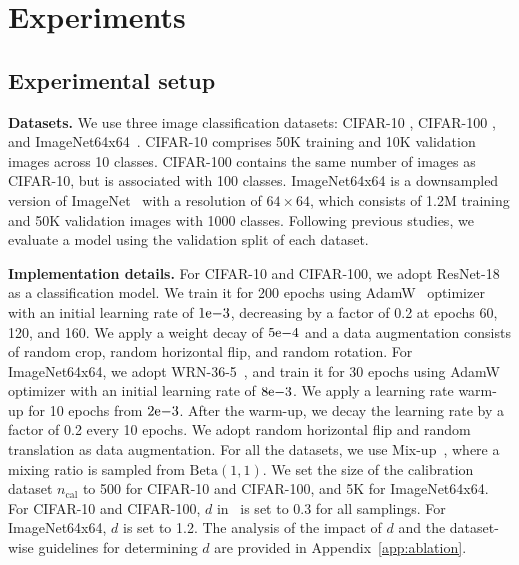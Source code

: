 \section{Experiments}
\label{sec:exp}

\subsection{Experimental setup}
\label{sec:setup}

\textbf{Datasets.}
We use three image classification datasets: CIFAR-10 \citep{krizhevsky2009learning}, CIFAR-100 \citep{krizhevsky2009learning}, and ImageNet64x64~\citep{chrabaszcz2017downsampled}.
CIFAR-10 comprises 50K training and 10K validation images across 10 classes.
CIFAR-100 contains the same number of images as CIFAR-10, but is associated with 100 classes.
ImageNet64x64 is a downsampled version of ImageNet~\citep{5206848} with a resolution of $64 \times 64$, which consists of 1.2M training and 50K validation images with 1000 classes.
Following previous studies, we evaluate a model using the validation split of each dataset.






\noindent\textbf{Implementation details.}
For CIFAR-10 and CIFAR-100, we adopt ResNet-18~\citep{he2016deep} as a classification model.
We train it for 200 epochs using AdamW~\citep{loshchilov2017decoupled} optimizer with an initial learning rate of ${1}\mathrm{e}{-3}$, decreasing by a factor of 0.2 at epochs 60, 120, and 160.
We apply a weight decay of ${5}\mathrm{e}{-4}$ and a data augmentation consists of random crop, random horizontal flip, and random rotation.
For ImageNet64x64, we adopt WRN-36-5~\citep{zagoruyko2016wide}, and train it for 30 epochs using AdamW optimizer with an initial learning rate of ${8}\mathrm{e}{-3}$.
We apply a learning rate warm-up for 10 epochs from ${2}\mathrm{e}{-3}$.
After the warm-up, we decay the learning rate by a factor of 0.2 every 10 epochs.
We adopt random horizontal flip and random translation as data augmentation.
For all the datasets, we use Mix-up~\citep{zhang2018mixup}, where a mixing ratio is sampled from $\text{Beta}(1,1)$.
We set the size of the calibration dataset $n_\text{cal}$ to 500 for CIFAR-10 and CIFAR-100, and 5K for ImageNet64x64.
For CIFAR-10 and CIFAR-100, $d$ in~ is set to 0.3 for all samplings. For ImageNet64x64, $d$ is set to 1.2.
The analysis of the impact of $d$ and the dataset-wise guidelines for determining $d$ are provided in Appendix~\ref{app:ablation}.

